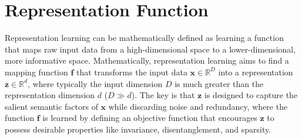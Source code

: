 \section*{Representation Function}

Representation learning can be mathematically defined as learning a function that maps raw input data from a high-dimensional space to a lower-dimensional, more informative space. Mathematically, representation learning aims to find a mapping function $\mathbf{f}$ that transforms the input data $\mathbf{x} \in \mathbb{R}^{D}$ into a representation $\mathbf{z} \in \mathbb{R}^{d}$, where typically the input dimension $D$ is much greater than the representation dimension $d$ ($D \gg d$). The key is that $\mathbf{z}$ is designed to capture the salient semantic factors of $\mathbf{x}$ while discarding noise and redundancy, where the function $\mathbf{f}$ is learned by defining an objective function that encourages $\mathbf{z}$ to possess desirable properties like invariance, disentanglement, and sparsity.











